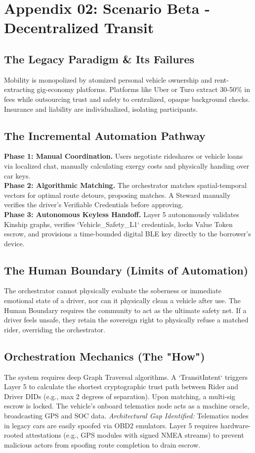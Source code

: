 \chapter{Appendix 02: Scenario Beta - Decentralized Transit}

\section{The Legacy Paradigm \& Its Failures}
Mobility is monopolized by atomized personal vehicle ownership and rent-extracting gig-economy platforms. Platforms like Uber or Turo extract 30-50\% in fees while outsourcing trust and safety to centralized, opaque background checks. Insurance and liability are individualized, isolating participants.

\section{The Incremental Automation Pathway}
\textbf{Phase 1: Manual Coordination.} Users negotiate rideshares or vehicle loans via localized chat, manually calculating exergy costs and physically handing over car keys. \\
\textbf{Phase 2: Algorithmic Matching.} The orchestrator matches spatial-temporal vectors for optimal route detours, proposing matches. A Steward manually verifies the driver's Verifiable Credentials before approving. \\
\textbf{Phase 3: Autonomous Keyless Handoff.} Layer 5 autonomously validates Kinship graphs, verifies `Vehicle\_Safety\_L1` credentials, locks Value Token escrow, and provisions a time-bounded digital BLE key directly to the borrower's device.

\section{The Human Boundary (Limits of Automation)}
The orchestrator cannot physically evaluate the soberness or immediate emotional state of a driver, nor can it physically clean a vehicle after use. The Human Boundary requires the community to act as the ultimate safety net. If a driver feels unsafe, they retain the sovereign right to physically refuse a matched rider, overriding the orchestrator.

\section{Orchestration Mechanics (The "How")}
The system requires deep Graph Traversal algorithms. A `TransitIntent` triggers Layer 5 to calculate the shortest cryptographic trust path between Rider and Driver DIDs (e.g., max 2 degrees of separation). Upon matching, a multi-sig escrow is locked. The vehicle's onboard telematics node acts as a machine oracle, broadcasting GPS and SOC data.
\textit{Architectural Gap Identified:} Telematics nodes in legacy cars are easily spoofed via OBD2 emulators. Layer 5 requires hardware-rooted attestations (e.g., GPS modules with signed NMEA streams) to prevent malicious actors from spoofing route completion to drain escrow.
